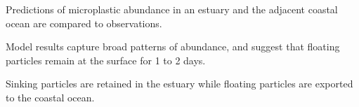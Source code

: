 \documentclass[draft]{jgr/agujournal2019}
\begin{document}

\begin{keypoints}
\item Predictions of microplastic abundance in an estuary and the adjacent coastal ocean are compared to
  observations.
\item Model results capture broad patterns of abundance, and suggest that floating particles remain at
  the surface for 1 to 2 days.
\item Sinking particles are retained in the estuary while floating particles are exported to the coastal
  ocean.
\end{keypoints}

%
%

%
%

\end{document}
